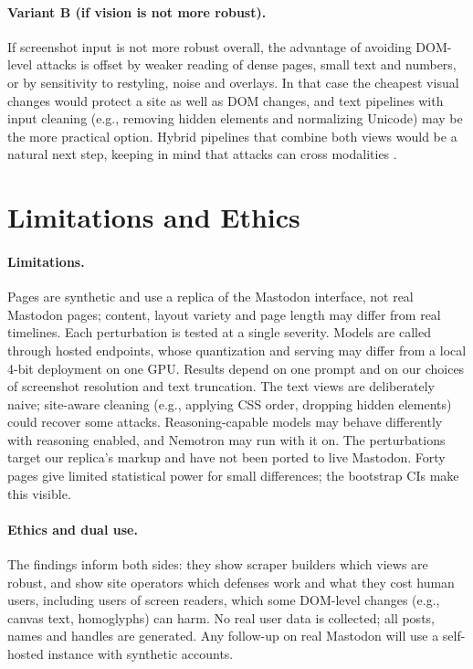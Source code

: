 \documentclass[letterpaper,10pt,twocolumn]{article}
\begin{document}
\paragraph{Variant B (if vision is not more robust).}
If screenshot input is not more robust overall, the advantage of avoiding
DOM-level attacks is offset by weaker reading of dense pages, small text and
numbers, or by sensitivity to restyling, noise and overlays. In that case the
cheapest visual changes would protect a site as well as DOM changes, and text
pipelines with input cleaning (e.g., removing hidden elements and normalizing
Unicode) may be the more practical option. Hybrid pipelines that combine both
views would be a natural next step, keeping in mind that attacks can cross
modalities \citep{wu2025dissecting}.

\section{Limitations and Ethics}

\paragraph{Limitations.}
Pages are synthetic and use a replica of the Mastodon interface, not real
Mastodon pages; content, layout variety and page length may differ from real
timelines. Each perturbation is tested at a single severity. Models are called
through hosted endpoints, whose quantization and serving may differ from a
local 4-bit deployment on one GPU. Results depend on one prompt and on our
choices of screenshot resolution and text truncation. The text views are
deliberately naive; site-aware cleaning (e.g., applying CSS order, dropping
hidden elements) could recover some attacks. Reasoning-capable models may
behave differently with reasoning enabled, and Nemotron may run with it on.
The perturbations target our replica's markup and have not been ported to
live Mastodon. Forty pages give limited
statistical power for small differences; the bootstrap CIs make this visible.

\paragraph{Ethics and dual use.}
The findings inform both sides: they show scraper builders which views are
robust, and show site operators which defenses work and what they cost human
users, including users of screen readers, which some DOM-level changes (e.g.,
canvas text, homoglyphs) can harm. No real user data is collected; all posts,
names and handles are generated. Any follow-up on real Mastodon will use a
self-hosted instance with synthetic accounts.
\end{document}
